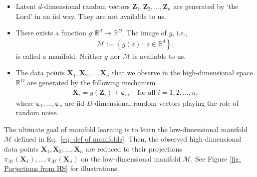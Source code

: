 \documentclass[11pt,letterpaper, leqno]{article}
\numberwithin{equation}{section}
\numberwithin{theorem}{section}
\numberwithin{lemma}{section}
\numberwithin{corollary}{section}
\numberwithin{definition}{section}
\numberwithin{proposition}{section}
\numberwithin{remark}{section}
\numberwithin{example}{section}
\begin{document}
\begin{itemize}
\item Latent $d$-dimensional random vectors $\boldsymbol{Z}_1, \boldsymbol{Z}_2, \ldots, \boldsymbol{Z}_n$ are generated by `the Lord' in an iid way. They are not available to us.

    \item There exists a function $g: \mathbb{R}^d \rightarrow\mathbb{R}^D$. The image of $g$, i.e.,  
    \begin{align}\label{eq: def of manifolds}
        \mathcal{M}:=\left\{g(z) \,:\, z\in\mathbb{R}^d  \right\},
    \end{align}
    is called a manifold. Neither $g$ nor $\mathcal{M}$ is available to us.

    \item The data points $\boldsymbol{X}_1, \boldsymbol{X}_2, \ldots, \boldsymbol{X}_n$ that we observe in the high-dimensional space $\mathbb{R}^D$ are generated by the following mechanism
    \begin{align}\label{eq: generic data generating mechanism}
        \boldsymbol{X}_i=g(\boldsymbol{Z}_i) + \boldsymbol{\varepsilon}_i,\ \ \ \text{ for all } i=1,2,\ldots,n,
    \end{align}
    where $\boldsymbol{\varepsilon}_1,\ldots, \boldsymbol{\varepsilon}_n$ are iid $D$-dimensional random vectors playing the role of random noise.
\end{itemize}
The ultimate goal of manifold learning is to learn the low-dimensional manifold $\mathcal{M}$ defined in Eq.~\eqref{eq: def of manifolds}. Then, the observed high-dimensional data points $\boldsymbol{X}_1, \boldsymbol{X}_2, \ldots, \boldsymbol{X}_n$ are reduced to their projections $\pi_{\mathcal{M}}(\boldsymbol{X}_1), \ldots, \pi_{\mathcal{M}}(\boldsymbol{X}_n)$ on the low-dimensional manifold $\mathcal{M}$. See Figure \ref{fig: Porjections from HS} for illustrations.
\end{document}
